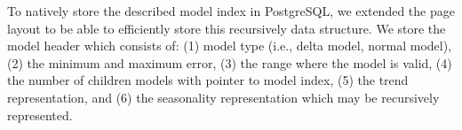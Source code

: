 \documentclass{sigmod}
\begin{document}
To natively store the described model index in PostgreSQL, we extended the page layout to be able to efficiently store this recursively data structure. We store the model header which consists of: (1) model type (i.e., delta model, normal model), (2) the minimum and maximum error, (3) the range where the model is valid, (4) the number of children models with pointer to model index, (5) the trend representation, and (6) the seasonality representation which may be recursively represented. 

 
  
 

\end{document}

